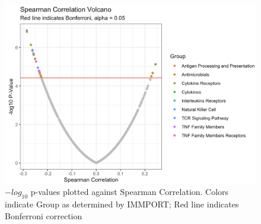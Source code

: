 \documentclass[
]{book}
\begin{document}
\begin{figure}

{\centering \includegraphics[width=1\linewidth]{Figures/IMMPORT Spearman} 

}

\caption{$-log_{10}$ p-values plotted against Spearman Correlation. Colors indicate Group as determined by IMMPORT; Red line indicates Bonferroni correction}\label{fig:04}
\end{figure}
\end{document}
